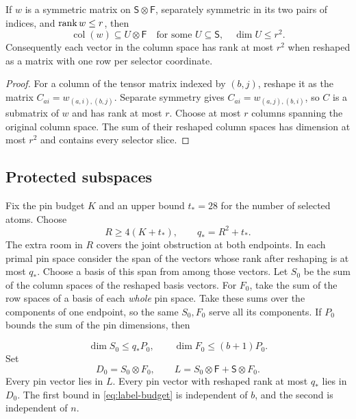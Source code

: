 \begin{lemma}\label{lem:selector-confinement}
If $w$ is a symmetric matrix on $\mathsf S\otimes\mathsf F$, separately
symmetric in its two pairs of indices, and $\operatorname{rank} w\le r$, then
\[
 \operatorname{col}(w)\subseteq U\otimes\mathsf F
 \quad\text{for some }U\subseteq\mathsf S,\quad \dim U\le r^2.
\]
Consequently each vector in the column space has rank at most \(r^2\)
when reshaped as a matrix with one row per selector coordinate.
\end{lemma}
\begin{proof}
For a column of the tensor matrix indexed by $(b,j)$, reshape it as the
matrix $C_{ai}=w_{(a,i),(b,j)}$. Separate symmetry gives
$C_{ai}=w_{(a,j),(b,i)}$, so $C$ is a submatrix of $w$ and has rank
at most $r$. Choose at most $r$ columns spanning the original column space.
The sum of their reshaped column spaces has dimension at most $r^2$
and contains every selector slice.
\end{proof}


\subsection{Protected subspaces}

Fix the pin budget \(K\) and an upper bound \(t_* =28\) for the number of
selected atoms. Choose
\[
 R\ge4(K+t_*),\qquad q_*=R^2+t_*.
\]
The extra room in \(R\) covers the joint obstruction at both endpoints.
In each primal pin space consider the span of the vectors whose rank
after reshaping is at most \(q_*\). Choose a basis of this span from
among those vectors. Let \(S_0\) be the sum of the column spaces of
the reshaped basis vectors. For \(F_0\), take the sum of the row spaces
of a basis of each \emph{whole} pin space. Take these sums over the
components of one endpoint, so the same \(S_0,F_0\) serve all its
components. If \(P_0\) bounds the sum of the pin dimensions, then

\begin{equation}\label{eq:label-budget}
 \dim S_0\le q_*P_0,\qquad \dim F_0\le(b+1)P_0.
\end{equation}
Set
\[
 D_0=S_0\otimes F_0,\qquad
 L=S_0\otimes\mathsf F+\mathsf S\otimes F_0.
\]
Every pin vector lies in \(L\). Every pin vector with reshaped rank at
most \(q_*\) lies in \(D_0\). The first bound in
\eqref{eq:label-budget} is independent of \(b\), and the second is independent
of \(n\).

